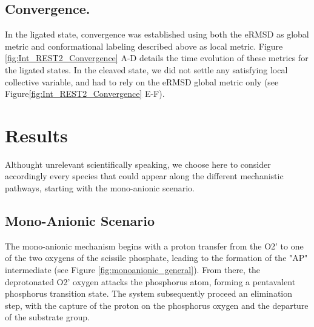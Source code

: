 \documentclass[journal=jacsat,manuscript=article]{achemso}
\begin{document}
\subsection{Convergence.}
In the ligated state, convergence was established using both the eRMSD as global metric
 and conformational labeling described above as local metric.
Figure \ref{fig:Int_REST2_Convergence} A-D details the time evolution of these metrics for the ligated states.
In the cleaved state, we did not settle any satisfying local collective variable, and had to rely on the eRMSD global metric only 
(see Figure\ref{fig:Int_REST2_Convergence} E-F).



\section{Results}

Althought unrelevant scientifically speaking, 
we choose here to consider accordingly every species that could appear along the different mechanistic pathways, 
starting with the mono-anionic scenario. 

\subsection{Mono-Anionic Scenario}

The mono-anionic mechanism begins with a proton transfer from the O2' to one of the two oxygens of the scissile phosphate,
leading to the formation of the "AP" intermediate (see Figure \ref{fig:monoanionic_general}).
From there, the deprotonated O2' oxygen attacks the phosphorus atom, forming a pentavalent phosphorus transition state.
The system subsequently proceed an elimination step, with the capture of the proton on the phosphorus oxygen and the departure of the substrate group.

\end{document}
